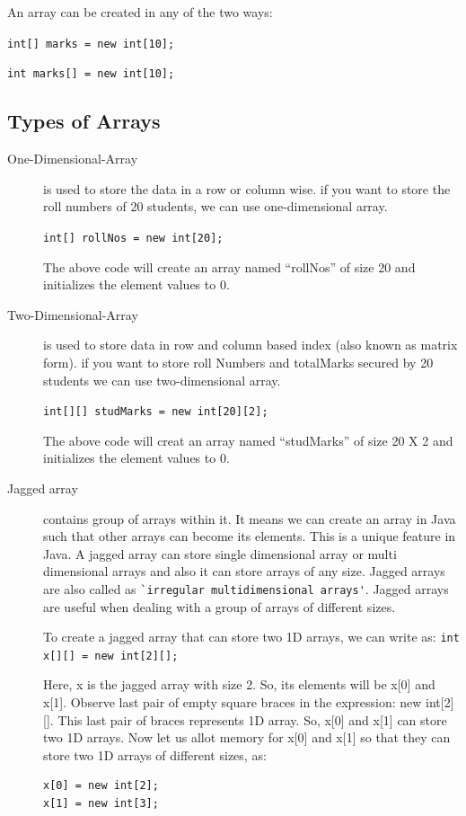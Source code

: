 \documentclass[11pt,a4paper]{article}
\begin{document}
An array can be created in any of the two ways:

\lstinline!int[] marks = new int[10];!

\lstinline!int marks[] = new int[10];!

\subsection*{Types of Arrays}
\begin{description}
\item [One-Dimensional-Array] is used to store the data in a row or column wise. if you want to store the roll numbers of 20 students, we can use one-dimensional array.

\lstinline!int[] rollNos = new int[20];!

The above code will create an array named ``rollNos'' of size 20 and initializes the element values to 0.

\item [Two-Dimensional-Array] is used to store data in row and column based index (also known as matrix form). if you want to store roll Numbers and totalMarks secured by 20 students we can use two-dimensional array.

\lstinline!int[][] studMarks = new int[20][2];!

The above code will creat an array named ``studMarks'' of size 20 X 2 and initializes the element values to 0.

\item [Jagged array] contains group of arrays within it. It means we can create an array in Java such that other arrays can become its elements. This is a unique feature in Java. A jagged array can store single dimensional array or multi dimensional arrays and also it can store arrays of any size. Jagged arrays are also called as \lstinline!`irregular multidimensional arrays'!. Jagged arrays are useful when dealing with a group of arrays of different sizes.

To create a jagged array that can store two 1D arrays, we can write as:
\lstinline!int x[][] = new int[2][];!

Here, x is the jagged array with size 2. So, its elements will be x[0] and x[1]. Observe last pair of empty square braces in the expression: new int[2][]. This last pair of braces represents 1D array. So, x[0] and x[1] can store two 1D arrays. Now let us allot memory for x[0] and x[1] so that they can store two 1D arrays of different sizes, as:

\begin{lstlisting}[numbers=none]
x[0] = new int[2];
x[1] = new int[3];
\end{lstlisting} 


\end{description}
\end{document}
